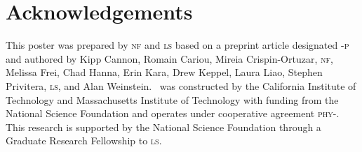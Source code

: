 \documentclass[portrait,plainboxedsections]{sciposter}
\begin{document}
\begin{minipage}[t]{0.25\textwidth}


\end{minipage}

\section*{Acknowledgements}

This poster was prepared by \textsc{nf} and \textsc{ls} based on a preprint
article designated \LIGO{}-\textsc{p} and authored by
Kipp Cannon, Romain Cariou, Mireia Crispin-Ortuzar, \textsc{nf}, Melissa Frei,
Chad Hanna, Erin Kara, Drew Keppel, Laura Liao, Stephen Privitera, \textsc{ls},
and Alan Weinstein. \LIGO\ was constructed by the California Institute of
Technology and Massachusetts Institute of Technology with funding from the
National Science Foundation and operates under cooperative agreement
\textsc{phy}-. This research is supported by the National
Science Foundation through a Graduate Research Fellowship to \textsc{ls}.
\end{document}
